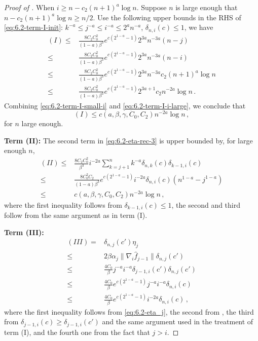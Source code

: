 \documentclass[11pt]{article}
\theoremstyle{plain}
\begin{document}
\begin{proof}[Proof of ]
When $i\ge n-c_2 (n+1)^a\log n$.  Suppose $n$ is large enough that $n-c_2(n+1)^a\log n\ge n/2$. Use the following upper bounds in the RHS of \eqref{eq:6.2-term-I-init}: 
$k^{-a}\le j^{-a}\le i^{-a}\le 2^{a} n^{-a}$, $\delta_{n,i}(c)\le 1$, we have
\begin{align}
   (I)\le  & \frac{8C_2 C_0^2 }{(1-a)\beta^3}e^{c(2^{1-a}-1)}2^{3a}n^{-3a}(n-j)\nonumber\\
    \le & \frac{8C_2 C_0^2 }{(1-a)\beta^3}e^{c(2^{1-a}-1)}2^{3a}n^{-3a}(n-i)\nonumber\\
    \le & \frac{8C_2 C_0^2 }{(1-a)\beta^3}e^{c(2^{1-a}-1)}2^{3a}n^{-3a}c_2(n+1)^a\log n\nonumber\\
    \le & \frac{8C_2 C_0^2 }{(1-a)\beta^3}e^{c(2^{1-a}-1)}2^{3a+1}c_2 n^{-2a}\log n\,.\label{eq:6.2-term-I-i-large}
\end{align}
Combining \eqref{eq:6.2-term-I-small-i} and \eqref{eq:6.2-term-I-i-large}, we conclude that
\begin{equation}
    \label{eq:6.2-term-I-final}
    (I)\le c(a,\beta,\gamma,C_0,C_2) n^{-2a}\log n\,,
\end{equation}
for $n$ large enough.

\textbf{Term (II):}
The second term in  \eqref{eq:6.2-eta-rec-3} is upper bounded by, for large enough $n$,
\begin{align}
  (II)\le &\frac{8 C_2 C_0^2 }{\beta^3}i^{-2a} \sum_{k=j+1}^n k^{-a} \delta_{n,k}(c)
 \delta_{k-1,i}(c)\nonumber\\
 \le & \frac{8 C_0^2 C_2}{(1-a)\beta^3} e^{c(2^{1-a}-1)}i^{-2a} \delta_{n,i}(c)(n^{1-a}-j^{1-a}) \nonumber\\
 \le & c(a,\beta,\gamma,C_0,C_2) n^{-2a}\log n\,,\label{eq:6.2-term-II-final}
\end{align}
where the first inequality follows from $\delta_{k-1,i}(c)\le 1$, the second and third follow from the same argument as in term (I).

\textbf{Term (III):}
\begin{align}
(III)=  &\delta_{n,j}(c')\eta_j\nonumber\\
\le & 2\beta\alpha_j \|\nabla_i\hat f_{j-1}\|\delta_{n,j}(c')\nonumber\\
\le & \frac{4C_0}{\beta}j^{-a}i^{-a}\delta_{j-1,i}(c')\delta_{n,j}(c')\nonumber\\
\le & \frac{4C_0}{\beta}e^{c(2^{1-a}-1)}j^{-a}i^{-a}\delta_{n,i}(c)\nonumber\\
\le & \frac{4C_0}{\beta}e^{c(2^{1-a}-1)}i^{-2a}\delta_{n,i}(c)\,,\label{eq:6.2-term-III-init}
\end{align}
where the first inequality follows from \eqref{eq:6.2-eta_j}, the second from , the third from $\delta_{j-1,i}(c)\ge \delta_{j-1,i}(c')$ and the same argument used in the treatment of term (I), and the fourth one from the fact that $j>i$. 


\end{proof}
\end{document}

